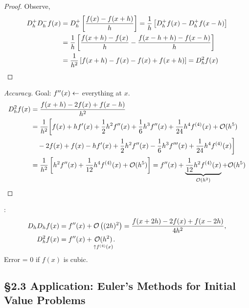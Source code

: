 \documentclass[]{article}
\begin{document}
\begin{proof}
	Observe, 
\begin{align*}
	D_h^+ D_h^- f(x) &= D_h^+ \blr{ \frac{f(x)-f(x+h)}h }
					 = \frac1h\blr{D_h^+f(x)-D_h^+f(x-h)} \\
					 &= \frac1h\blr{\frac{f(x+h)-f(x)}h-\frac{f(x-h+h)-f(x-h)}h} \\
					 &= \frac1{h^2}\blr{f(x+h)-f(x)-f(x)+f(x+h)}
					 = D_h^2f(x)
\end{align*}
\end{proof}
\begin{proof}
	[Accuracy] Goal: $f''(x) \la$ everything at $x$.
	\begin{align*}
		D_h^2f(x) &= \frac{f(x+h)-2f(x)+f(x-h)}{h^2} \\
				  &= \frac1{h^2} \bigg[ f(x) + hf'(x) + \frac12h^2f''(x) + \frac16h^3f''(x) + \frac1{24}h^4f^{(4)}(x) + \mc O(h^5) \\
				  &\quad - 2f(x) + f(x) - hf'(x) + \frac12h^2f''(x)-\frac16h^3f'''(x) + \frac1{24}h^4f^{(4)}(x) \bigg] \\
				  &= \frac1{h^2}\blr{h^2f''(x) + \frac1{12}h^4f^{(4)}(x)+\mc O(h^5)}
				  = f''(x) + \ub{\mc O(h^2)}{\frac1{12}h^2f^{(4)}(x)} + \mc O(h^5)
	\end{align*}
\end{proof}
\begin{note}:
	\begin{align*}
		\ds D_h D_hf(x) &= f''(x) + \mc O\plr{(2h)^2} = \frac{f(x+2h)-2f(x)+f(x-2h)}{4h^2}, \\
		D_h^2f(x) &= f''(x) + \us{\uparrow f^{(4)}(x)}{\mc O(h^2)}.
	\end{align*}
	Error = 0 if $f(x)$ is cubic.
\end{note}

\subsection*{\S2.3 Application: Euler's Methods for Initial Value Problems}
\end{document}
